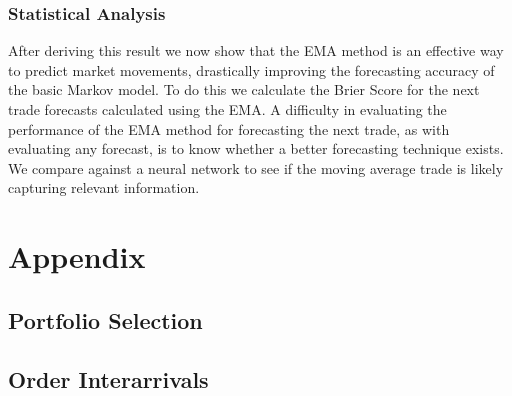 \documentclass[a4paper,10pt]{article}
\begin{document}
\subsubsection{Statistical Analysis}
After deriving this result we now show that the EMA method is an effective way to predict market movements, drastically improving the forecasting accuracy of the basic Markov model. To do this we calculate the Brier Score for the next trade forecasts calculated using the EMA. A difficulty in evaluating the performance of the EMA method for forecasting the next trade, as with evaluating any forecast, is to know whether a better forecasting technique exists. We compare against a neural network to see if the moving average trade is likely capturing relevant information.
\section{Appendix}
\subsection{Portfolio Selection}
\subsection{Order Interarrivals}
\medskip
\printbibliography
\end{document}
